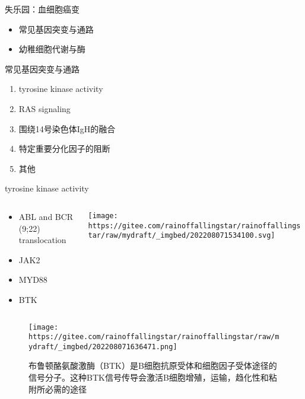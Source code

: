 \documentclass[
  ignorenonframetext,
]{beamer}
\begin{document}
\begin{frame}{失乐园：血细胞癌变}
\protect\hypertarget{ux5931ux4e50ux56edux8840ux7ec6ux80deux764cux53d8}{}
\begin{itemize}
\item
  常见基因突变与通路
\item
  幼稚细胞代谢与酶
\end{itemize}
\end{frame}

\begin{frame}
\begin{block}{常见基因突变与通路}
\protect\hypertarget{ux5e38ux89c1ux57faux56e0ux7a81ux53d8ux4e0eux901aux8def}{}
\begin{enumerate}
\item
  tyrosine kinase activity
\item
  RAS signaling
\item
  围绕14号染色体IgH的融合
\item
  特定重要分化因子的阻断
\item
  其他
\end{enumerate}
\end{block}
\end{frame}

\begin{frame}
\begin{block}{tyrosine kinase activity}
\protect\hypertarget{tyrosine-kinase-activity}{}
\begin{columns}[T]
\begin{column}{0.3\textwidth}
\begin{itemize}
\item
  ABL and BCR (9;22) translocation
\item
  JAK2
\item
  MYD88
\item
  BTK
\end{itemize}
\end{column}

\begin{column}{0.7\textwidth}
\texttt{[image: https://gitee.com/rainoffallingstar/rainoffallingstar/raw/mydraft/\_imgbed/202208071534100.svg]}
\end{column}
\end{columns}
\end{block}
\end{frame}

\begin{frame}
\begin{figure}
\centering
\texttt{[image: https://gitee.com/rainoffallingstar/rainoffallingstar/raw/mydraft/\_imgbed/202208071636471.png]}
\caption{布鲁顿酪氨酸激酶（BTK）是B细胞抗原受体和细胞因子受体途径的信号分子。这种BTK信号传导会激活B细胞增殖，运输，趋化性和粘附所必需的途径}
\end{figure}
\end{frame}
\end{document}
